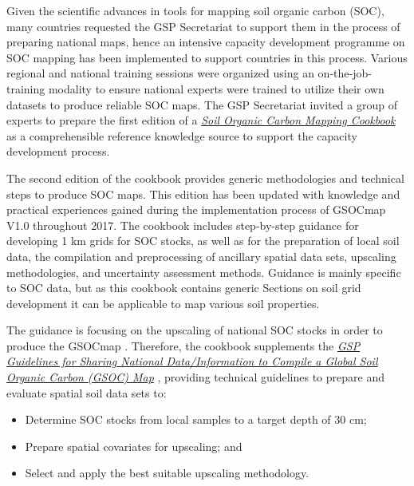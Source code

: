 \documentclass[10pt,b5paper,]{book}
\providecommand{\tightlist}{%
  \setlength{\itemsep}{0pt}\setlength{\parskip}{0pt}}
\theoremstyle{definition}
\theoremstyle{definition}
\theoremstyle{definition}
\theoremstyle{remark}
\begin{document}
Given the scientific advances in tools for mapping soil organic carbon
(SOC), many countries requested the GSP Secretariat to support them in
the process of preparing national maps, hence an intensive capacity
development programme on SOC mapping has been implemented to support
countries in this process. Various regional and national training
sessions were organized using an on-the-job-training modality to ensure
national experts were trained to utilize their own datasets to produce
reliable SOC maps. The GSP Secretariat invited a group of experts to
prepare the first edition of a
\href{http://www.fao.org/3/a-bs901e.pdf}{\emph{Soil Organic Carbon
Mapping Cookbook}} \citep{cookbook_2017} as a comprehensible reference
knowledge source to support the capacity development process.

The second edition of the cookbook provides generic methodologies and
technical steps to produce SOC maps. This edition has been updated with
knowledge and practical experiences gained during the implementation
process of GSOCmap V1.0 
throughout 2017. The cookbook includes step-by-step guidance for
developing 1 km grids for SOC stocks, as well as for the preparation of
local soil data, the compilation and preprocessing of ancillary spatial
data sets, upscaling methodologies, and uncertainty assessment methods.
Guidance is mainly specific to SOC data, but as this cookbook contains
generic Sections on soil grid development it can be applicable to map
various soil properties.

The guidance is focusing on the upscaling of national SOC stocks in
order to produce the GSOCmap
. Therefore, the
cookbook supplements the
\href{http://www.fao.org/3/a-bp164e.pdf}{\emph{GSP Guidelines for
Sharing National Data/Information to Compile a Global Soil Organic
Carbon (GSOC) Map}} \citep{gsp_guidelines_2017}, providing technical
guidelines to prepare and evaluate spatial soil data sets to:

\begin{itemize}
\tightlist
\item
  Determine SOC stocks from local samples to a target depth of 30 cm;
\item
  Prepare spatial covariates  for
  upscaling; and
\item
  Select and apply the best suitable upscaling methodology.
\end{itemize}
\end{document}
